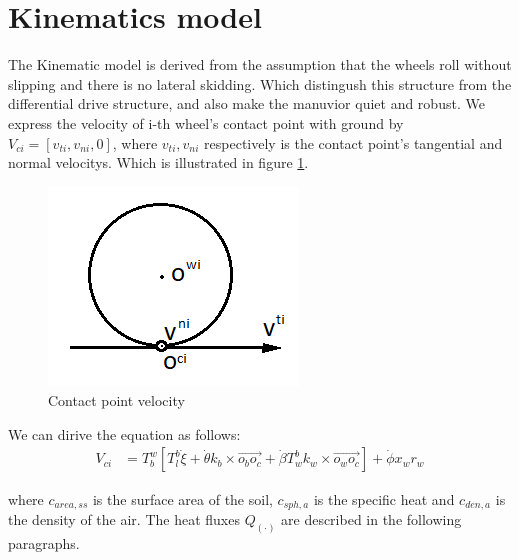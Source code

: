 \section{Kinematics model}
\label{sec:Kinematics}
The Kinematic model is derived from the assumption that the wheels roll without slipping and there is no lateral skidding. Which distingush this structure from the differential drive structure, and also make
the manuvior quiet and robust.
We express the velocity of i-th wheel's contact point with ground by $V_{ci}=[v_{ti},v_{ni},0]$, where $v_{ti},v_{ni}$ respectively is the contact point's  tangential and normal velocitys. Which is illustrated in 
figure \cref{fig:contact_point}.

\begin{figure}[t]
	\begin{center}
	\includegraphics[width=.7\textwidth]{../Figures/wheelframe.png}
	\caption{Contact point velocity}
	\label{fig:contact_point}
	\end{center}
\end{figure}

We can dirive the equation as follows:
\begin{equation}\label{eq:contact_point_velocity}
	\begin{split}
	V_{ci} &= T_b^w [T_l^b\dot{\xi} + \dot{\theta}k_b\times\overrightarrow{o_bo_c} + \dot{\beta}T_w^bk_w\times\overrightarrow{o_wo_c}] + \dot{\phi}x_wr_w
	\end{split}
	\end{equation}



where $c_{area,ss}$ is the surface area of the soil, $c_{sph,a}$ is the specific heat and $c_{den,a}$ is the density of the air.
The heat fluxes $Q_{(\cdot)}$ are described in the following paragraphs.

